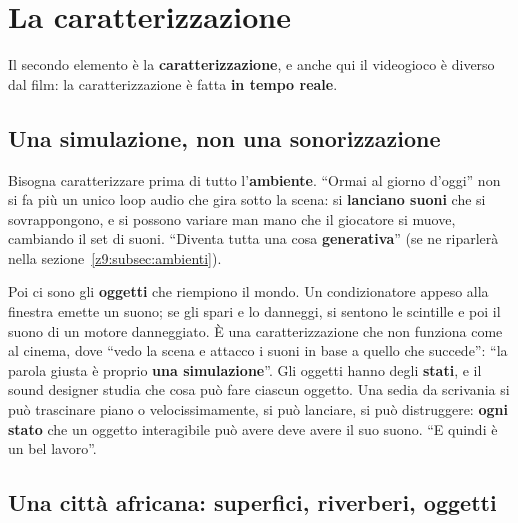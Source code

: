 \section{La caratterizzazione}
\label{z9:sec:caratterizzazione}

Il secondo elemento è la \textbf{caratterizzazione}, e anche qui il videogioco è
diverso dal film: la caratterizzazione è fatta \textbf{in tempo reale}.

\subsection{Una simulazione, non una sonorizzazione}

Bisogna caratterizzare prima di tutto l'\textbf{ambiente}. ``Ormai al giorno
d'oggi'' non si fa più un unico loop audio che gira sotto la scena: si
\textbf{lanciano suoni} che si sovrappongono, e si possono variare man mano che
il giocatore si muove, cambiando il set di suoni. ``Diventa tutta una cosa
\textbf{generativa}'' (se ne riparlerà nella
sezione~\ref{z9:subsec:ambienti}).

Poi ci sono gli \textbf{oggetti} che riempiono il mondo. Un condizionatore
appeso alla finestra emette un suono; se gli spari e lo danneggi, si sentono le
scintille e poi il suono di un motore danneggiato. È una caratterizzazione che
non funziona come al cinema, dove ``vedo la scena e attacco i suoni in base a
quello che succede'': ``la parola giusta è proprio \textbf{una simulazione}''.
Gli oggetti hanno degli \textbf{stati}, e il sound designer studia che cosa può
fare ciascun oggetto. Una sedia da scrivania si può trascinare piano o
velocissimamente, si può lanciare, si può distruggere: \textbf{ogni stato} che
un oggetto interagibile può avere deve avere il suo suono. ``E quindi è un bel
lavoro''.

\subsection{Una città africana: superfici, riverberi, oggetti}

